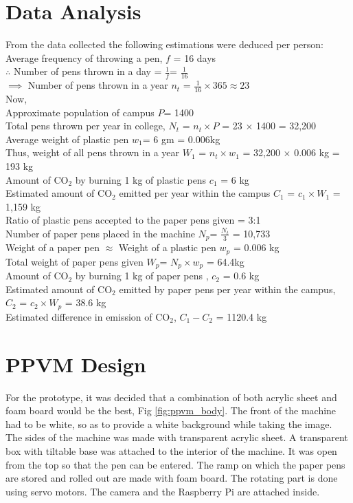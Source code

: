 \section{Data Analysis}

From the data collected the following estimations were deduced per person:
\\Average frequency of throwing a pen, $f$ = 16 days\\
$\therefore$ Number of pens thrown in a day = $\frac{1}{f}$= $\frac{1}{16}$ \\
$\implies$ Number of pens thrown in a year $n_t$ = $\frac{1}{16}\times 365\approx 23$ \\
Now,\\
Approximate population of campus $P$= 1400\\
Total pens thrown per year in college, $N_t$ = $n_t \times P$ = 23 $\times $ 1400 = 32,200 \\
Average weight of plastic pen $w_1$= 6 gm = 0.006kg\\
Thus, weight of all pens thrown in a year $W_1$ = $n_t \times w_1$ =   32,200 $\times$ 0.006 kg = 193 kg\\
Amount of CO$_2$ by burning 1 kg of plastic pens $c_1$ = 6 kg\\
Estimated amount of CO$_2$ emitted per year within the campus $C_1$ = $c_1 \times W_1$ = 1,159 kg\\
Ratio of plastic pens accepted to the paper pens given = 3:1\\
Number of paper pens placed in the machine $N_p$= $\frac{N_t}{3}$ = 10,733\\
Weight of a paper pen $\approx$ Weight of a plastic pen $w_p$ = 0.006 kg\\
Total weight of paper pens given $W_p$= $N_p \times w_p$ = 64.4kg\\
Amount of CO$_2$ by burning 1 kg of paper pens , $c_2$ = 0.6 kg\\
Estimated amount of CO$_2$ emitted by paper pens per year within the campus,\\ $C_2$ = $c_2 \times W_p$  = 38.6 kg\\
Estimated difference in emission of CO$_2$, $C_1-C_2$ = 1120.4 kg

\section{PPVM Design}
For the prototype, it was decided that a combination of both acrylic sheet and foam board would be the best, Fig \ref{fig:ppvm_body}. The front of the machine had to be white, so as to provide a white background while taking the image. The sides of the machine was made with transparent acrylic sheet. A transparent box with tiltable base was attached to the interior of the machine. It was open from the top so that the pen can be entered. The ramp on which the paper pens are stored and rolled out are made with foam board. The rotating part is done using servo motors. The camera and the Raspberry Pi are attached inside.

